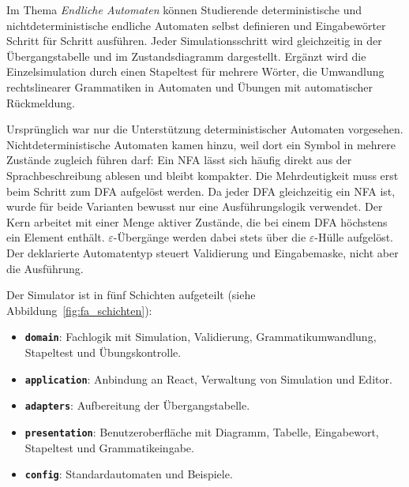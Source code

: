  \label{4_2_EA}

Im Thema \emph{Endliche Automaten} können Studierende deterministische und
nichtdeterministische endliche Automaten selbst definieren und Eingabewörter Schritt
für Schritt ausführen.
Jeder Simulationsschritt wird gleichzeitig in der Übergangstabelle und im
Zustandsdiagramm dargestellt.
Ergänzt wird die Einzelsimulation durch einen Stapeltest für mehrere Wörter, die
Umwandlung rechtslinearer Grammatiken in Automaten und Übungen mit automatischer
Rückmeldung.


Ursprünglich war nur die Unterstützung deterministischer Automaten vorgesehen.
Nichtdeterministische Automaten kamen hinzu, weil dort ein Symbol in mehrere Zustände zugleich
führen darf: Ein NFA lässt sich häufig direkt aus der Sprachbeschreibung ablesen und bleibt
kompakter. Die Mehrdeutigkeit muss erst beim Schritt zum DFA aufgelöst werden.
Da jeder DFA gleichzeitig ein NFA ist, wurde für beide Varianten bewusst nur eine
Ausführungslogik verwendet.
Der Kern arbeitet mit einer Menge aktiver Zustände, die bei einem DFA höchstens ein
Element enthält. $\varepsilon$-Übergänge werden dabei stets über die
$\varepsilon$-Hülle aufgelöst.
Der deklarierte Automatentyp steuert Validierung und Eingabemaske, nicht aber die
Ausführung.

Der Simulator ist in fünf Schichten aufgeteilt
(siehe Abbildung~\ref{fig:fa_schichten}):

\begin{itemize}\itemsep0.4ex
\item \textbf{\texttt{domain}}: Fachlogik mit Simulation, Validierung, Grammatikumwandlung, Stapeltest und Übungskontrolle.
\item \textbf{\texttt{application}}: Anbindung an React, Verwaltung von Simulation und Editor.
\item \textbf{\texttt{adapters}}: Aufbereitung der Übergangstabelle.
\item \textbf{\texttt{presentation}}: Benutzeroberfläche mit Diagramm, Tabelle, Eingabewort, Stapeltest und Grammatikeingabe.
\item \textbf{\texttt{config}}: Standardautomaten und Beispiele.
\end{itemize}

